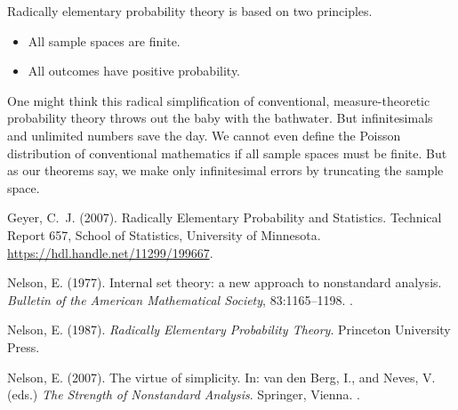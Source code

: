 \documentclass[11pt]{article}
\begin{document}
Radically elementary probability theory is based on two principles.
\begin{itemize}
\item All sample spaces are finite.
\item All outcomes have positive probability.
\end{itemize}
One might think this radical simplification of conventional, measure-theoretic
probability theory throws out the baby with the bathwater.  But infinitesimals
and unlimited numbers save the day.  We cannot even define the Poisson
distribution of conventional mathematics if all sample spaces must be finite.
But as our theorems say, we make only infinitesimal errors by truncating
the sample space.

\begin{thebibliography}{}

Geyer, C.~J. (2007).
\newblock Radically Elementary Probability and Statistics.
\newblock Technical Report 657, School of Statistics, University of Minnesota. 
\newblock \url{https://hdl.handle.net/11299/199667}.

Nelson, E. (1977).
\newblock Internal set theory: a new approach to nonstandard analysis.
\newblock \emph{Bulletin of the American Mathematical Society}, 83:1165--1198.
\newblock {}.

Nelson, E. (1987).
\newblock \emph{Radically Elementary Probability Theory}.
\newblock Princeton University Press.

Nelson, E. (2007).
\newblock The virtue of simplicity.
\newblock In: van den Berg, I., and Neves, V. (eds.)
    \emph{The Strength of Nonstandard Analysis}.
\newblock Springer, Vienna.
\newblock {}.

\end{thebibliography}
\end{document}
